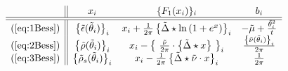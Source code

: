 		
$$
\begin{array}{c||ccc}
	& x_i & \{F_1(x_i) \}_i & b_i \\
	\hline\hline
	(\ref{eq:1Bess}) & \left \{\tilde{\epsilon}(\tilde{\theta}_i) \right \}_i  & x_i + \frac{1}{2 \pi} \left \{\tilde{\Delta} \star \ln \left ( 1 + e^{x } \right )  \right \}_i  & - \tilde{\mu} + \frac{\tilde{\theta}_i^2 }{t}	\\
	(\ref{eq:2Bess}) & \left \{\tilde{\rho}(\tilde{\theta}_i) \right \}_i  & x_i  - \left  \{ \frac{\tilde{\nu}}{2 \pi} \cdot \left \{\tilde{\Delta} \star x \right  \} \right \}_i & \frac{\left \{\tilde{\nu}(\tilde{\theta}_i) \right \}_i}{2 \pi} \\
	(\ref{eq:3Bess}) &  \left \{\tilde{\rho}_s(\tilde{\theta}_i) \right \}_i & x_i - \frac{1}{2 \pi} \left \{\tilde{\Delta} \star \tilde{\nu} \cdot  x \right \}_i & \frac{1}{2 \pi} 
\end{array}\\
$$
